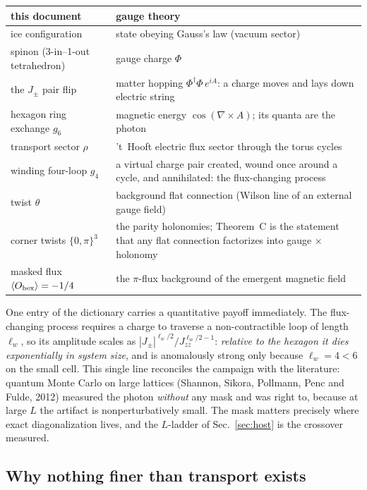 \documentclass[11pt,a4paper]{article}
\newcommand{\Jpm}{J_{\pm}}
\newcommand{\Jzz}{J_{zz}}
\newcommand{\gfour}{g_4}
\newcommand{\gsix}{g_6}
\newcommand{\Ohex}{O_{\rm hex}}
\begin{document}
\begin{center}
\small
\begin{tabular}{p{6.2cm}p{7.6cm}}
\toprule
\textbf{this document} & \textbf{gauge theory}\\
\midrule
ice configuration & state obeying Gauss's law (vacuum sector)\\[2pt]
spinon (3-in--1-out tetrahedron) & gauge charge $\Phi$\\[2pt]
the $\Jpm$ pair flip & matter hopping $\Phi^\dagger\Phi\,e^{iA}$: a charge
moves and lays down electric string\\[2pt]
hexagon ring exchange $\gsix$ & magnetic energy $\cos(\nabla\times A)$; its
quanta are the photon\\[2pt]
transport sector $\rho$ & 't~Hooft electric flux sector through the torus
cycles\\[2pt]
winding four-loop $\gfour$ & a virtual charge pair created, wound once
around a cycle, and annihilated: the flux-changing process\\[2pt]
twist $\theta$ & background flat connection (Wilson line of an external
gauge field)\\[2pt]
corner twists $\{0,\pi\}^3$ & the parity holonomies; Theorem~C is the
statement that any flat connection factorizes into gauge $\times$
holonomy\\[2pt]
masked flux $\langle\Ohex\rangle=-1/4$ & the $\pi$-flux background of the
emergent magnetic field\\
\bottomrule
\end{tabular}
\end{center}

One entry of the dictionary carries a quantitative payoff immediately.  The
flux-changing process requires a charge to traverse a non-contractible loop
of length $\ell_w$, so its amplitude scales as
$|\Jpm|^{\ell_w/2}/\Jzz^{\ell_w/2-1}$: \emph{relative to the hexagon it dies
exponentially in system size}, and is anomalously strong only because
$\ell_w=4<6$ on the small cell.  This single line reconciles the campaign
with the literature: quantum Monte Carlo on large lattices (Shannon, Sikora,
Pollmann, Penc and Fulde, 2012) measured the photon \emph{without} any mask
and was right to, because at large $L$ the artifact is nonperturbatively
small.  The mask matters precisely where exact diagonalization lives, and
the $L$-ladder of Sec.~\ref{sec:host} is the crossover measured.

\subsection{Why nothing finer than transport exists}
\label{sec:nolabel}
\end{document}

